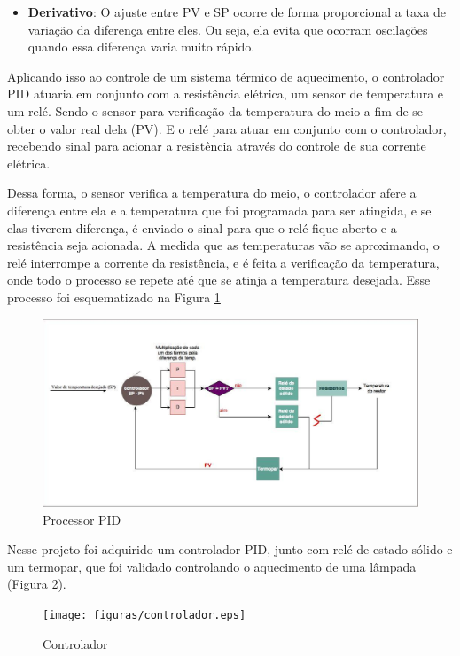 \begin{enumerate}
\begin{itemize}
	\item \textbf{Derivativo}: O ajuste entre PV e SP ocorre de forma proporcional a taxa de variação da diferença entre eles. Ou seja, ela evita que ocorram oscilações quando essa diferença varia muito rápido.
\end{itemize}

Aplicando isso ao controle de um sistema térmico de aquecimento, o controlador PID atuaria em conjunto com a resistência elétrica, um sensor de temperatura e um relé. Sendo o sensor para verificação da temperatura do meio a fim de se obter o valor real dela (PV). E o relé para atuar em conjunto com o controlador, recebendo sinal para acionar a resistência através do controle de sua corrente elétrica.

Dessa forma, o sensor verifica a temperatura do meio, o controlador afere a diferença entre ela e a temperatura que foi programada para ser atingida, e se elas tiverem diferença, é enviado o sinal para que o relé fique aberto e a resistência seja acionada. A medida que as temperaturas vão se aproximando, o relé interrompe a corrente da resistência, e é feita a verificação da temperatura, onde todo o processo se repete até que se atinja a temperatura desejada. Esse processo foi esquematizado na Figura \ref{processo}

\begin{figure}[H]
 \centering
 \includegraphics[keepaspectratio=true,scale=0.4]{figuras/processo.eps}
 \caption{Processor PID}
 \label{processo}
\end{figure}

Nesse projeto foi adquirido um controlador PID, junto com relé de estado sólido e um termopar, que foi validado controlando o aquecimento de uma lâmpada (Figura \ref{controlador}).

\begin{figure}[h]
 \centering
 \texttt{[image: figuras/controlador.eps]}
 \caption{Controlador}
 \label{controlador}
\end{figure}

\end{enumerate}

